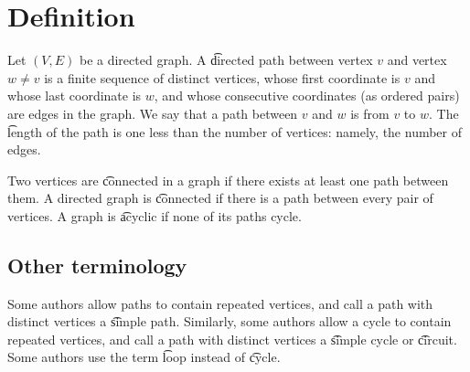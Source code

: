 

\section*{Definition}

Let $(V, E)$ be a directed graph.
A \t{directed path} between vertex $v$ and vertex $w \neq v$ is a finite sequence of distinct vertices, whose first coordinate is $v$ and whose last coordinate is $w$, and whose consecutive coordinates (as ordered pairs) are edges in the graph.
We say that a path between $v$ and $w$ is from $v$ to $w$.
The \t{length} of the path is one less than the number of vertices: namely, the number of edges.

Two vertices are \t{connected} in a graph if there exists at least one path between them.
A directed graph is \t{connected} if there is a path between every pair of vertices.
A graph is \t{acyclic} if none of its paths cycle.

\subsection*{Other terminology}

Some authors allow paths to contain repeated vertices, and call a path with distinct vertices a \t{simple path}.
Similarly, some authors allow a cycle to contain repeated vertices, and call a path with distinct vertices a \t{simple cycle} or \t{circuit}.
Some authors use the term \t{loop} instead of \t{cycle}.

\blankpage